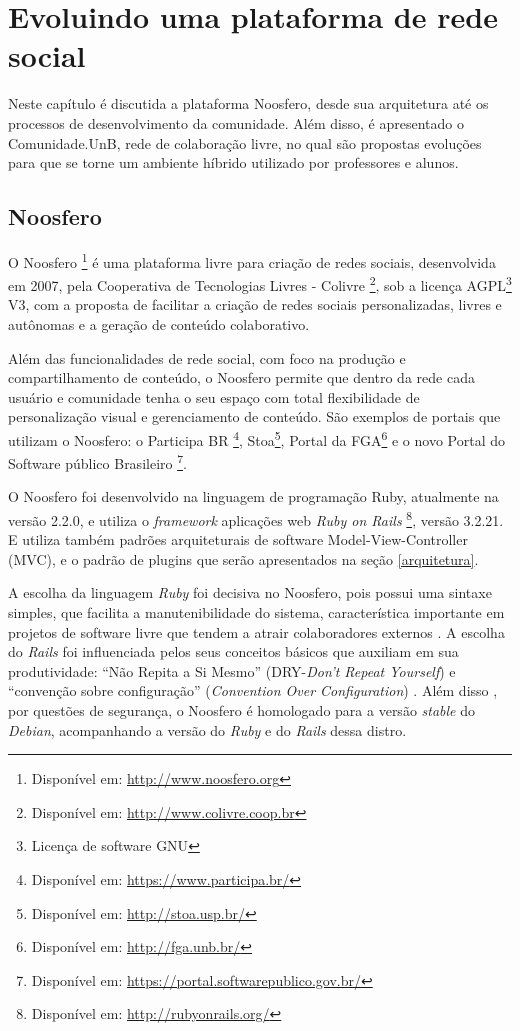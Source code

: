 \chapter{Evoluindo uma plataforma de rede social}
\label{evol-rede-social}

Neste capítulo é discutida a plataforma Noosfero, desde sua arquitetura até os processos de desenvolvimento da comunidade. Além disso, é apresentado o Comunidade.UnB, rede de colaboração livre, no qual são propostas evoluções para que se torne um ambiente híbrido utilizado por professores e alunos.

\section{Noosfero}
\label{noosfero}

O Noosfero \footnote{Disponível em: \url{http://www.noosfero.org}} é uma plataforma livre para criação de redes sociais, desenvolvida em 2007, pela Cooperativa de Tecnologias Livres - Colivre \footnote{Disponível em: \url{http://www.colivre.coop.br}}, sob a licença AGPL\footnote{Licença de software GNU} V3, com a proposta de facilitar a criação de redes sociais personalizadas, livres e autônomas e a geração de conteúdo colaborativo.

Além das funcionalidades de rede social, com foco na produção e compartilhamento de conteúdo, o Noosfero permite que dentro da rede cada usuário e comunidade tenha o seu espaço com total flexibilidade de personalização visual e gerenciamento de conteúdo. São exemplos de portais que utilizam o Noosfero: o Participa BR \footnote{Disponível em: \url{https://www.participa.br/}}, Stoa\footnote{Disponível em: \url{http://stoa.usp.br/}}, Portal da FGA\footnote{Disponível em: \url{http://fga.unb.br/}} e o novo Portal do Software público Brasileiro \footnote{Disponível em: \url{https://portal.softwarepublico.gov.br/}}.

O Noosfero foi desenvolvido na linguagem de programação Ruby, atualmente na versão 2.2.0, e utiliza o \textit{framework} aplicações web \textit{Ruby on Rails} \footnote{Disponível em: \url{http://rubyonrails.org/}}, versão 3.2.21. E utiliza também padrões arquiteturais de software Model-View-Controller (MVC), e o padrão de plugins que serão apresentados na seção \ref{arquitetura}.

A escolha da linguagem \textit{Ruby} foi decisiva no Noosfero, pois possui uma sintaxe simples, que facilita a manutenibilidade do sistema, característica importante em projetos de software livre que tendem a atrair colaboradores externos \cite{meirelles2013}. A escolha do \textit{Rails} foi influenciada pelos seus conceitos básicos que auxiliam em sua produtividade: ``Não Repita a Si Mesmo'' (DRY-\textit{Don't Repeat Yourself}) e ``convenção sobre configuração'' (\textit{Convention Over Configuration}) \cite{akita2006repensando}. Além disso , por questões de segurança, o Noosfero é homologado para a versão \textit{stable} do \textit{Debian}, acompanhando a versão do \textit{Ruby} e do \textit{Rails} dessa distro.

